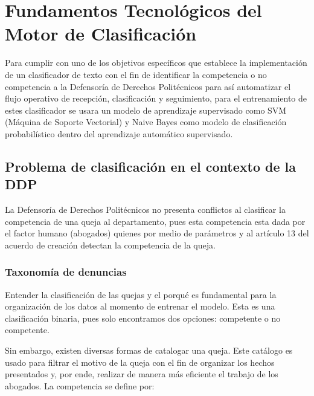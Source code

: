 \chapter{Fundamentos Tecnológicos del Motor de Clasificación}

Para cumplir con uno de los objetivos específicos que establece la implementación de un clasificador de texto con el fin de identificar la competencia o no competencia a la Defensoría de Derechos Politécnicos para así automatizar el flujo operativo de recepción, clasificación y seguimiento, para el entrenamiento de estes clasificador se usara un modelo de aprendizaje supervisado como SVM (Máquina de Soporte Vectorial) y Naive Bayes como modelo de clasificación probabilístico dentro del aprendizaje automático supervisado.

\section{Problema de clasificación en el contexto de la DDP}

La Defensoría de Derechos Politécnicos no presenta conflictos al clasificar la competencia de una queja al departamento, pues esta competencia esta dada por el factor humano (abogados) quienes por medio de parámetros y al artículo 13 del acuerdo de creación detectan la competencia de la queja.

\subsection{Taxonomía de denuncias}

Entender la clasificación de las quejas y el porqué es fundamental para la organización de los datos al momento de entrenar el modelo. Esta es una clasificación binaria, pues solo encontramos dos opciones: competente o no competente.

Sin embargo, existen diversas formas de catalogar una queja. Este catálogo es usado para filtrar el motivo de la queja con el fin de organizar los hechos presentados y, por ende, realizar de manera más eficiente el trabajo de los abogados. La competencia se define por:

